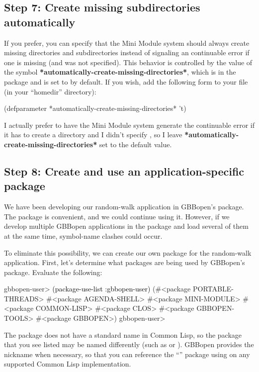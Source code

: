 \documentclass[10pt,twoside,english,pdftex]{article}
\begin{document}
\subsection*{Step 7: Create missing subdirectories automatically}

%
If you prefer, you can specify that the Mini Module system should always
create missing  directories and subdirectories
instead of signaling an continuable error if one is missing (and
 was not specified).  This behavior is controlled by the
value of the symbol \textbf{*automatically-create-missing-directories*}, which
is in the  package and is set to \nil{} by default.
If you wish, add the following form to your  file (in
your ``homedir'' directory):
%
\W\supp
\begin{example}
  (defparameter *automatically-create-missing-directories* 't)
\end{example}

I actually prefer to have the Mini Module system generate the continuable
error if it has to create a  directory and I
didn't specify , so I leave
\textbf{*automatically-create-missing-directories*} set to the default \nil{}
value.

\subsection*{Step 8: Create and use an application-specific package}

We have been developing our random-walk application in GBBopen's
 package.  The  package is convenient,
and we could continue using it.  However, if we develop multiple GBBopen
applications in the  package and load several of them at
the same time, symbol-name clashes could occur.

To eliminate this possibility, we can create our own package for the
random-walk application.  First, let's determine what packages are being used by GBBopen's  package.  Evaluate the following:
%
\W\supp
\begin{example}
\textcolor{darkergray}{%
  gbbopen-user> \textcolor{black}{(package-use-list :gbbopen-user)}
  (#<package PORTABLE-THREADS> #<package AGENDA-SHELL>
   #<package MINI-MODULE> #<package COMMON-LISP> #<package CLOS>
   #<package GBBOPEN-TOOLS> #<package GBBOPEN>)
  gbbopen-user>}
\end{example}
%
The  package does not have a standard name in Common Lisp, so the
package that you see listed may be named differently (such as  or
).  GBBopen provides the  nickname when necessary, so
that you can reference the ``'' package using  on any
supported Common Lisp implementation.
\end{document}
